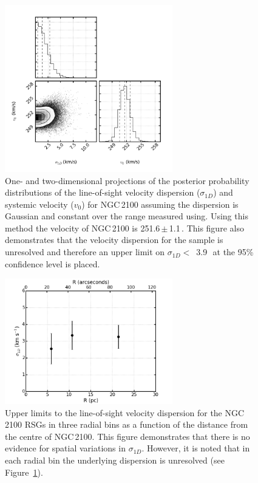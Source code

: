 \begin{figure}
\centering
 \includegraphics[width=0.65\textwidth]{ngc2100/NGC2100-sigRV-triangle}
 \caption{One- and two-dimensional projections of the posterior probability distributions of the line-of-sight velocity dispersion ($\sigma_{1D}$) and systemic velocity ($v_{0}$) for NGC\,2100 assuming the dispersion is Gaussian and constant over the range measured using.
 Using this method the velocity of NGC\,2100 is 251.6\,$\pm$\,1.1\,\kms.
 This figure also demonstrates that the velocity dispersion for the sample is unresolved and therefore an upper limit on $\sigma_{1D} <$~3.9\,\kms~at the 95\% confidence level is placed.
\label{fig:sig1d}
          }
\end{figure}

\begin{figure}
\centering
 \includegraphics[width=0.65\textwidth]{ngc2100/NGC2100-sig1d-bins}
 \caption{Upper limits to the line-of-sight velocity dispersion for the NGC\,2100 RSGs in three radial bins as a function of the distance from the centre of NGC\,2100.
 This figure demonstrates that there is no evidence for spatial variations in $\sigma_{1D}$.
 However, it is noted that in each radial bin the underlying dispersion is unresolved (see Figure~\ref{fig:sig1d}).
\label{fig:sig1dbins}
          }
\end{figure}

